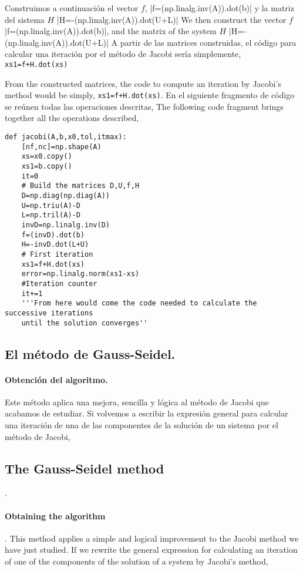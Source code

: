 \begin{paracol}{2}
Construimos a continuación el vector $f$, 
 |f=(np.linalg.inv(A)).dot(b)| 
y la matriz del sistema $H$ 
|H=-(np.linalg.inv(A)).dot(U+L)|
\switchcolumn
We then construct the vector $f$ |{f=(np.linalg.inv(A)).dot(b)}|, and the matrix of the system $H$ |H=-(np.linalg.inv(A)).dot(U+L)|
\switchcolumn
A partir de las matrices construidas, el código para calcular una iteración por el método de Jacobi sería simplemente, \texttt{xs1=f+H.dot(xs)}
\switchcolumn

From the constructed matrices, the code to compute an iteration by Jacobi's method would be simply, \texttt{xs1=f+H.dot(xs)}.
\switchcolumn
En el siguiente fragmento de código se reúnen todas las operaciones descritas,
\switchcolumn
The following code fragment brings together all the operations described,
\end{paracol}
\begin{verbatim}
def jacobi(A,b,x0,tol,itmax):
    [nf,nc]=np.shape(A)
    xs=x0.copy()
    xs1=b.copy()
    it=0
    # Build the matrices D,U,f,H
    D=np.diag(np.diag(A))
    U=np.triu(A)-D
    L=np.tril(A)-D
    invD=np.linalg.inv(D)
    f=(invD).dot(b)
    H=-invD.dot(L+U)
    # First iteration
    xs1=f+H.dot(xs)
    error=np.linalg.norm(xs1-xs)
    #Iteration counter
    it+=1
    '''From here would come the code needed to calculate the successive iterations 
    until the solution converges''

\end{verbatim}

\begin{paracol}{2}
\subsection{El método de Gauss-Seidel.} 
\paragraph{Obtención del algoritmo.} Este método aplica una mejora, sencilla y lógica al método de Jacobi que acabamos de estudiar. Si volvemos a escribir la expresión general para calcular una iteración de una de las componentes de la solución de un sistema por el método de Jacobi,
\switchcolumn
\subsection{The Gauss-Seidel method}. 
\paragraph{Obtaining the algorithm}. This method applies a simple and logical improvement to the Jacobi method we have just studied. If we rewrite the general expression for calculating an iteration of one of the components of the solution of a system by Jacobi's method,
\end{paracol}

